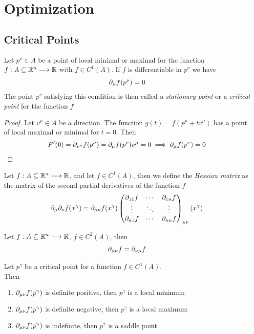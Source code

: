 \documentclass[../complete.tex]{subfiles}
\begin{document}
\section{Optimization}
\subsection{Critical Points}
\begin{thm}[Fermat]
	Let $p^\nu\in A$ be a point of local minimal or maximal for the function $f:A\subseteq\mathbb{R}^n\overset{}{\longrightarrow}\mathbb{R}$ with $f\in C^1(A)$. If $f$ is differentiable in $p^\nu$ we have
	\begin{equation}
		\partial_\mu f(p^\nu)=0
		\label{eq:fermthm}
	\end{equation}
	The point $p^\nu$ satisfying this condition is then called a \textit{stationary point} or a \textit{critical point} for the function $f$
\end{thm}
\begin{proof}
	Let $v^\mu\in A$ be a direction. The function $g(t)=f(p^\mu+tv^\mu)$ has a point of local maximal or minimal for $t=0$. Then
	\begin{equation}
		F'(0)=\partial_{v^\mu}f(p^\nu)=\partial_\mu f(p^\nu)v^\mu=0\implies{}\partial_\mu f(p^\nu)=0
		\label{eq:frmthmproof}
	\end{equation}
\end{proof}
\begin{dfn}
	Let $f:A\subseteq\mathbb{R}^n\overset{}{\longrightarrow}\mathbb{R}$, and let $f\in C^1(A)$, then we define the \textit{Hessian matrix} as the matrix of the second partial derivatives of the function $f$
	\begin{equation}
		\partial_\mu\partial_\nu f(x^\gamma)=\partial_{\mu\nu}f(x^\gamma)\begin{pmatrix}\partial_{11}f&\cdots&\partial_{1n}f\\\vdots&\ddots&\vdots\\\partial_{n1}f&\cdots&\partial_{nn}f\end{pmatrix}_{\mu\nu}(x^\gamma)
		\label{eq:hessianmatrix}
	\end{equation}
\end{dfn}
\begin{thm}[Schwarz]
	Let $f:A\subseteq\mathbb{R}^n\overset{}{\longrightarrow}\mathbb{R}$, $f\in C^2(A)$, then
	\begin{equation}
		\partial_{\mu\nu}f=\partial_{\nu\mu}f
		\label{eq:simmhess}
	\end{equation}
\end{thm}
\begin{dfn}
	Let $p^\gamma$ be a critical point for a function $f\in C^1(A)$.\\
	Then
	\begin{enumerate}
	\item $\partial_{\mu\nu}f(p^\gamma)$ is definite positive, then $p^\gamma$ is a local minimum
	\item $\partial_{\mu\nu}f(p^\gamma)$ is definite negative, then $p^\gamma$ is a local maximum
	\item $\partial_{\mu\nu}f(p^\gamma)$ is indefinite, then $p^\gamma$ is a saddle point
	\end{enumerate}
\end{dfn}
\end{document}

